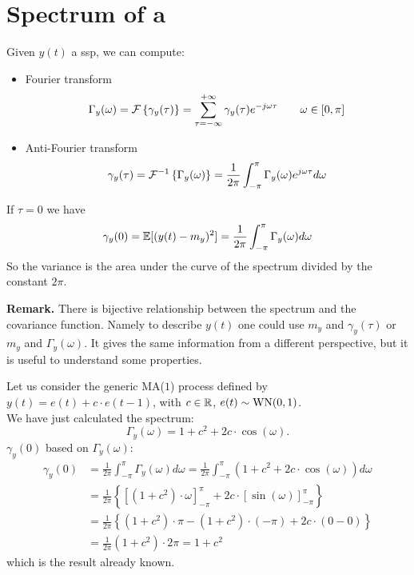 \section{Spectrum of a }
Given $y(t)$ a \gls{ssp}, we can compute:
\begin{itemize}
	\item Fourier transform
	\[
		\Gamma _{y}(\omega)=\mathcal{F}\left\{\gamma _{y}(\tau )\right\}=\sum_{\tau =-\infty }^{+\infty} \gamma _{y}(\tau ) e^{-j\omega \tau } \qquad \omega \in [0,\pi ]
	\]
	\item Anti-Fourier transform
	\[
		\gamma _{y}(\tau)=\mathcal{F}^{-1}\left\{\Gamma _{y}(\omega)\right\}=\frac{1}{2\pi }\int_{-\pi }^{\pi } \Gamma _{y}(\omega )e^{j\omega \tau }d\omega  
	\]
\end{itemize}

\begin{rem}
If $\tau =0$ we have
\[
	\gamma _{y}(0)=\mathbb{E}[(y(t)-m_{y})^2 ]=\frac{1}{2\pi }\int_{-\pi }^{\pi } \Gamma _{y}(\omega )d\omega 
\]
So the variance is the area under the curve of the spectrum divided by the constant $2\pi$.
\end{rem}
\textbf{Remark.}
There is bijective relationship between the spectrum and the covariance function. Namely to describe $y(t)$ one could use $m_{y}$ and $\gamma _{y}(\tau )$ or $m_{y}$ and $\Gamma _{y}(\omega)$. It gives the same information from a different perspective, but it is useful to understand some properties.

\begin{exa}
Let us consider the generic MA($1$) process defined by $y(t)=e(t)+c \cdot e(t-1)$, with $c \in \mathbb{R}$, $e(t)\sim \operatorname{WN}(0,1)$.\\
We have just calculated the spectrum:
$$
\Gamma_y(\omega)=1+c^{2}+2 c \cdot \cos(\omega).
$$
$\gamma_{y}(0)$ based on $\Gamma_y(\omega)$:
\begin{align*}
	\gamma_{y}(0)&=\frac{1}{2\pi}\int_{-\pi}^\pi\Gamma_y(\omega) d\omega=\frac{1}{2\pi}\int_{-\pi}^\pi\left(1+c^{2}+2 c \cdot \cos (\omega)\right) d\omega\\
	&=\frac{1}{2\pi}\left\{\left[\left(1+c^2\right)\cdot\omega\right]_{-\pi}^\pi + 2c\cdot\left[\sin(\omega)\right]_{-\pi}^\pi\right\}\\
	&=\frac{1}{2\pi}\left\{\left(1+c^2\right)\cdot\pi - \left(1+c^2\right)\cdot(-\pi) + 2c\cdot(0-0)\right\}\\
    &=\frac{1}{2\pi}\left(1+c^2\right)\cdot 2\pi = 1+c^2
\end{align*}
which is the result already known.
\end{exa}
\newpage
